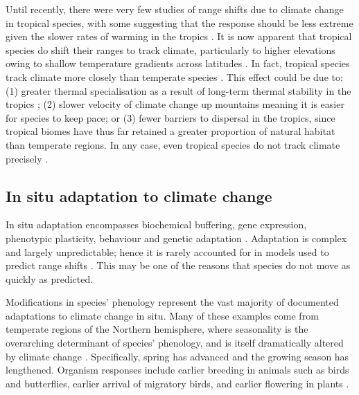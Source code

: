 \documentclass[12pt,a4paper,]{report}
\theoremstyle{definition}
\theoremstyle{definition}
\theoremstyle{definition}
\theoremstyle{remark}
\begin{document}
Until recently, there were very few studies of range shifts due to
climate change in tropical species, with some suggesting that the
response should be less extreme given the slower rates of warming in the
tropics \citep{freeman_rapid_2014, ipcc_climate_2013}. It is now
apparent that tropical species do shift their ranges to track climate,
particularly to higher elevations
\citep{chen_elevation_2009, pounds_biological_1999} owing to shallow
temperature gradients across latitudes \citep{colwell_global_2008}. In
fact, tropical species track climate more closely than temperate species
\citep{freeman_rapid_2014}. This effect could be due to: (1) greater
thermal specialisation as a result of long-term thermal stability in the
tropics \citep{freeman_rapid_2014}; (2) slower velocity of climate
change up mountains \citep{loarie_velocity_2009} meaning it is easier
for species to keep pace; or (3) fewer barriers to dispersal in the
tropics, since tropical biomes have thus far retained a greater
proportion of natural habitat than temperate regions. In any case, even
tropical species do not track climate precisely
\citep{chen_elevation_2009}.

\subsection{In situ adaptation to climate
change}\label{in-situ-adaptation-to-climate-change}

In situ adaptation encompasses biochemical buffering, gene expression,
phenotypic plasticity, behaviour and genetic adaptation
\citep{peck_organisms_2011}. Adaptation is complex and largely
unpredictable; hence it is rarely accounted for in models used to
predict range shifts \citep{peck_organisms_2011}. This may be one of the
reasons that species do not move as quickly as predicted.

Modifications in species' phenology represent the vast majority of
documented adaptations to climate change in situ. Many of these examples
come from temperate regions of the Northern hemisphere, where
seasonality is the overarching determinant of species' phenology, and is
itself dramatically altered by climate change
\citep{bradshaw_evolutionary_2006}. Specifically, spring has advanced
and the growing season has lengthened. Organism responses include
earlier breeding in animals such as birds and butterflies, earlier
arrival of migratory birds, and earlier flowering in plants
\citep{walther_ecological_2002}.
\end{document}
